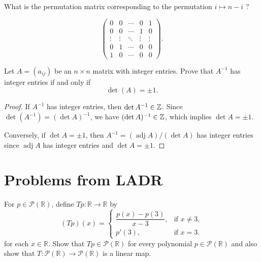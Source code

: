 \documentclass{article}
\begin{document}
\begin{problem}[I.4.6]
  What is the permutation matrix corresponding to the permutation \( i \mapsto n-i \) ?
\end{problem}

\begin{solution}
  \[ \left(\begin{matrix}
    0 & 0 & \cdots & 0 & 1 \\
    0 & 0 & \cdots & 1 & 0 \\
    \vdots & \vdots & \ddots & \vdots & \vdots \\
    0 & 1 & \cdots & 0 & 0 \\
    1 & 0 & \cdots & 0 & 0
  \end{matrix}\right). \] 
\end{solution}

\begin{problem}[I.5.3]
  Let $A=(a_{ij})$ be an $n\times n$ matrix with integer entries. Prove that
  $A^{-1}$ has integer entries if and only if
  \[
  \det(A)=\pm 1.
  \]
\end{problem}

\begin{proof}
  If \( A^{-1} \) has integer entries, then \( \det A^{-1}\in\mathbb{Z} \). Since \( \det(A^{-1}) = (\det A)^{-1} \), we have \( (\det A)^{-1} \in \mathbb{Z} \), which implies \( \det A = \pm 1 \). \par
  Conversely, if \( \det A = \pm 1 \), then \( A^{-1}=(\operatorname{adj} A)/(\det A) \) has integer entries since \( \operatorname{adj} A \) has integer entries and \( \det A = \pm 1 \).
\end{proof}

\section{Problems from LADR}

\begin{problem}[4-10]
  For $p \in \mathcal{P}(\mathbb{R})$, define $Tp:\mathbb{R}\to\mathbb{R}$ by
  \[
  (Tp)(x)=
  \begin{cases}
    \dfrac{p(x)-p(3)}{x-3}, & \text{if } x\neq 3,\\
    p'(3), & \text{if } x=3.
  \end{cases}
  \]
  for each $x\in\mathbb{R}$. Show that $Tp\in\mathcal{P}(\mathbb{R})$ for every
  polynomial $p\in\mathcal{P}(\mathbb{R})$ and also show that
  $T:\mathcal{P}(\mathbb{R})\to\mathcal{P}(\mathbb{R})$ is a linear map.
\end{problem}
\end{document}
